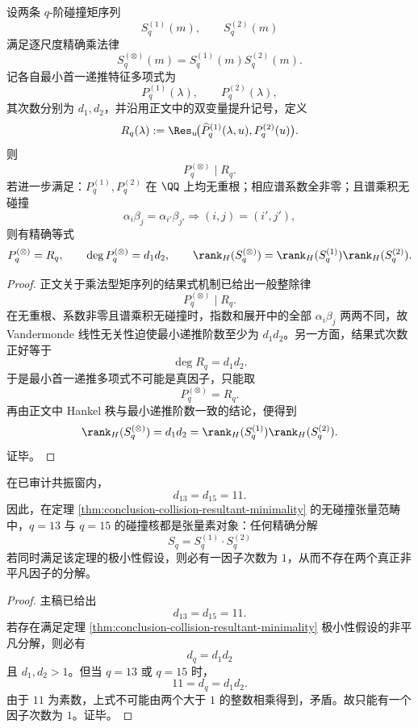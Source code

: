 \begin{theorem}[乘法闭包下最小递推的结果式极小性]\label{thm:conclusion-collision-resultant-minimality}
设两条 \(q\)-阶碰撞矩序列
\[
S_q^{(1)}(m),\qquad S_q^{(2)}(m)
\]
满足逐尺度精确乘法律
\[
S_q^{(\otimes)}(m)=S_q^{(1)}(m)S_q^{(2)}(m).
\]
记各自最小首一递推特征多项式为
\[
P_q^{(1)}(\lambda),\qquad P_q^{(2)}(\lambda),
\]
其次数分别为 \(d_1,d_2\)，并沿用正文中的双变量提升记号，定义
\[
R_q(\lambda):=\Res_u\!\bigl(\widehat P_q^{(1)}(\lambda,u),P_q^{(2)}(u)\bigr).
\]
则
\[
P_q^{(\otimes)}\mid R_q.
\]
若进一步满足：\(P_q^{(1)},P_q^{(2)}\) 在 \(\QQ\) 上均无重根；相应谱系数全非零；且谱乘积无碰撞
\[
\alpha_i\beta_j=\alpha_{i'}\beta_{j'}
\Longrightarrow
(i,j)=(i',j'),
\]
则有精确等式
\[
P_q^{(\otimes)}=R_q,
\qquad
\deg P_q^{(\otimes)}=d_1d_2,
\qquad
\rank_H(S_q^{(\otimes)})=\rank_H(S_q^{(1)})\rank_H(S_q^{(2)}).
\]
\end{theorem}
\begin{proof}
正文关于乘法型矩序列的结果式机制已给出一般整除律
\[
P_q^{(\otimes)}\mid R_q.
\]
在无重根、系数非零且谱乘积无碰撞时，指数和展开中的全部 \(\alpha_i\beta_j\) 两两不同，故 Vandermonde 线性无关性迫使最小递推阶数至少为 \(d_1d_2\)。另一方面，结果式次数正好等于
\[
\deg R_q=d_1d_2.
\]
于是最小首一递推多项式不可能是真因子，只能取
\[
P_q^{(\otimes)}=R_q.
\]
再由正文中 Hankel 秩与最小递推阶数一致的结论，便得到
\[
\rank_H(S_q^{(\otimes)})=d_1d_2=\rank_H(S_q^{(1)})\rank_H(S_q^{(2)}).
\]
证毕。
\end{proof}

\begin{proposition}[共振窗内的张量素核]\label{prop:conclusion-collision-resonant-kernel-tensor-prime}
在已审计共振窗内，
\[
d_{13}=d_{15}=11.
\]
因此，在定理 \ref{thm:conclusion-collision-resultant-minimality} 的无碰撞张量范畴中，\(q=13\) 与 \(q=15\) 的碰撞核都是张量素对象：任何精确分解
\[
S_q=S_q^{(1)}\cdot S_q^{(2)}
\]
若同时满足该定理的极小性假设，则必有一因子次数为 \(1\)，从而不存在两个真正非平凡因子的分解。
\end{proposition}
\begin{proof}
主稿已给出
\[
d_{13}=d_{15}=11.
\]
若存在满足定理 \ref{thm:conclusion-collision-resultant-minimality} 极小性假设的非平凡分解，则必有
\[
d_q=d_1d_2
\]
且 \(d_1,d_2>1\)。但当 \(q=13\) 或 \(q=15\) 时，
\[
11=d_q=d_1d_2.
\]
由于 \(11\) 为素数，上式不可能由两个大于 \(1\) 的整数相乘得到，矛盾。故只能有一个因子次数为 \(1\)。证毕。
\end{proof}
